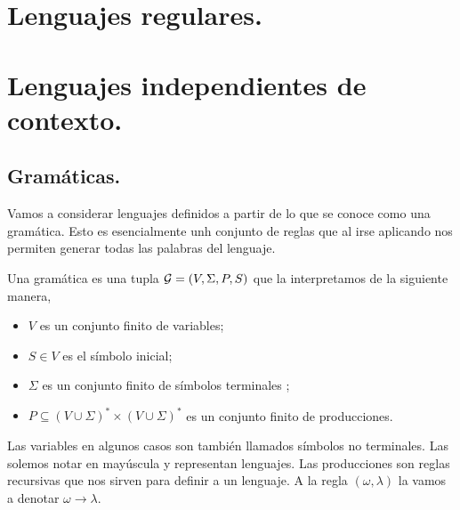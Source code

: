 \documentclass[tesis.tex]{subfiles}
\begin{document}
\begin{comment}
	\begin{obs}
	De esta manera podemos pensar a una {presentación} de un monoide $M$  como un epimorfismo de monoides $\pi: \Sigma^{*} \to M$. Esto nos dice que el monoide $M$ tiene como generadores a $\Sigma$ y sus relaciones están dadas por el núcleo del morfismo $\pi$.
	\end{obs}
\end{comment}

\section{Lenguajes regulares.}







\section{Lenguajes independientes de contexto.}
\subsection{Gramáticas.}
Vamos a considerar lenguajes definidos a partir de lo que se conoce como una gramática. Esto es esencialmente unh conjunto de reglas que al irse aplicando nos permiten generar todas las palabras del lenguaje.

\begin{deff}
	Una gramática es una tupla ${\cal G} = (V, \Sigma, P, S)$ que la interpretamos de la siguiente manera,
\begin{itemize}
		\item $V$ es un conjunto finito de variables;
		\item $S \in V$ es el símbolo inicial;
		\item $\Sigma$ es un conjunto finito de símbolos terminales ;
		\item $P \subseteq (V \cup \Sigma)^* \times (V \cup \Sigma)^*$ es un conjunto finito de producciones.
\end{itemize}
\end{deff}

Las variables en algunos casos son también llamados símbolos no terminales. Las solemos notar en mayúscula y representan lenguajes. Las producciones son reglas recursivas que nos sirven para definir a un lenguaje. A la regla $(\omega, \lambda)$ la vamos a denotar $\omega \to \lambda$.
\end{document}
